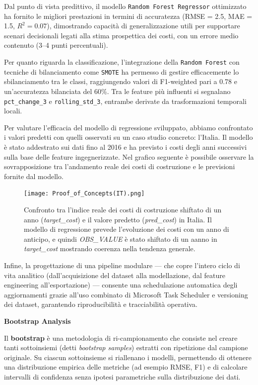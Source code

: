 \documentclass[conference]{IEEEtran}
\begin{document}
Dal punto di vista predittivo, il modello \texttt{Random Forest Regressor} ottimizzato ha fornito le migliori prestazioni in termini di accuratezza (RMSE = 2.5, MAE = 1.5, $R^2 = 0.07$), dimostrando capacità di generalizzazione utili per supportare scenari decisionali legati alla stima prospettica dei costi, con un errore medio contenuto (3–4 punti percentuali).

Per quanto riguarda la classificazione, l’integrazione della \texttt{Random Forest} con tecniche di bilanciamento come \texttt{SMOTE} ha permesso di gestire efficacemente lo sbilanciamento tra le classi, raggiungendo valori di F1-weighted pari a 0.78 e un'accuratezza bilanciata del 60\%. Tra le feature più influenti si segnalano \texttt{pct\_change\_3} e \texttt{rolling\_std\_3}, entrambe derivate da trasformazioni temporali locali.

Per valutare l’efficacia del modello di regressione sviluppato, abbiamo confrontato i valori predetti con quelli osservati su un caso studio concreto: l’Italia. Il modello è stato addestrato sui dati fino al 2016 e ha previsto i costi degli anni successivi sulla base delle feature ingegnerizzate. Nel grafico seguente è possibile osservare la sovrapposizione tra l’andamento reale dei costi di costruzione e le previsioni fornite dal modello.

\begin{figure}[H]
\centering
\texttt{[image: Proof\_of\_Concepts(IT).png]}
\caption{Confronto tra l’indice reale dei costi di costruzione shiftato di un anno (\textit{target\_cost}) e il valore predetto (\textit{pred\_cost}) in Italia. Il modello di regressione prevede l’evoluzione dei costi con un anno di anticipo, e quindi \textit{OBS\_VALUE} è stato shiftato di un aanno in \textit{target\_cost} mostrando coerenza nella tendenza generale.}
\label{fig:proof-of-concepts}
\end{figure}

Infine, la progettazione di una pipeline modulare — che copre l’intero ciclo di vita analitico (dall’acquisizione del dataset alla modellazione, dal feature engineering all’esportazione) — consente una schedulazione automatica degli aggiornamenti grazie all’uso combinato di Microsoft Task Scheduler e versioning dei dataset, garantendo riproducibilità e tracciabilità operativa.

\vspace{0.5em}
\noindent\textbf{Bootstrap Analysis}

Il \textbf{bootstrap} è una metodologia di ri-campionamento che consiste nel creare tanti sottoinsiemi (detti \emph{bootstrap samples}) estratti con ripetizione dal campione originale.  
Su ciascun sottoinsieme si riallenano i modelli, permettendo di ottenere una distribuzione empirica delle metriche (ad esempio RMSE, F1) e di calcolare intervalli di confidenza senza ipotesi parametriche sulla distribuzione dei dati.
\end{document}

